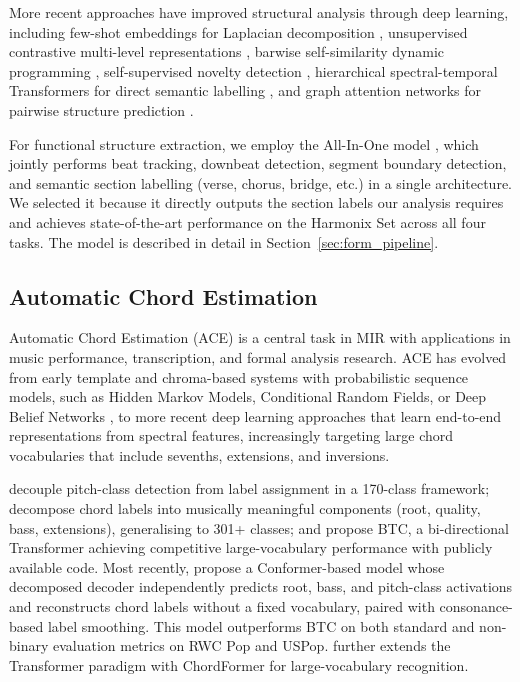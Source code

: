 \documentclass{article}
\begin{document}
More recent approaches have improved structural analysis through deep learning, including few-shot embeddings for Laplacian decomposition \citep{salamon2021deep}, unsupervised contrastive multi-level representations \citep{buisson2022learning}, barwise self-similarity dynamic programming \citep{marmoret2023barwise}, self-supervised novelty detection \citep{peeters2023self}, hierarchical spectral-temporal Transformers for direct semantic labelling \citep{wang2022catch}, and graph attention networks for pairwise structure prediction \citep{buisson2024using}.

For functional structure extraction, we employ the All-In-One model \citep{taejun2023allinone}, which jointly performs beat tracking, downbeat detection, segment boundary detection, and semantic section labelling (verse, chorus, bridge, etc.) in a single architecture. We selected it because it directly outputs the section labels our analysis requires and achieves state-of-the-art performance on the Harmonix Set across all four tasks. The model is described in detail in Section~\ref{sec:form_pipeline}. 

\subsection{Automatic Chord Estimation}
\label{sec:ace}
Automatic Chord Estimation (ACE) is a central task in MIR with applications in music performance, transcription, and formal analysis research. ACE has evolved from early template and chroma-based systems with probabilistic sequence models, such as Hidden Markov Models, Conditional Random Fields, or Deep Belief Networks \citep{mauch2009simultaneous, ni2012end, humphrey2015four}, to more recent deep learning approaches that learn end-to-end representations from spectral features, increasingly targeting large chord vocabularies that include sevenths, extensions, and inversions.

\citet{mcfee2017structured} decouple pitch-class detection from label assignment in a 170-class framework; \citet{jiang2019large} decompose chord labels into musically meaningful components (root, quality, bass, extensions), generalising to 301+ classes; and \citet{park2019bi} propose BTC, a bi-directional Transformer achieving competitive large-vocabulary performance with publicly available code. Most recently, \citet{poltronieri2025discord} propose a Conformer-based model whose decomposed decoder independently predicts root, bass, and pitch-class activations and reconstructs chord labels without a fixed vocabulary, paired with consonance-based label smoothing. This model outperforms BTC on both standard and non-binary evaluation metrics on RWC Pop and USPop. \citet{waseem2025chordformer} further extends the Transformer paradigm with ChordFormer for large-vocabulary recognition.
\end{document}
